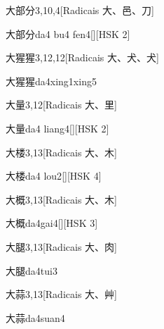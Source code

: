 \begin{entry}{大部分}{3,10,4}[Radicais ⼤、⾢、⼑]
  \begin{phonetics}{大部分}{da4 bu4 fen4}[][HSK 2]
  \end{phonetics}
\end{entry}

\begin{entry}{大猩猩}{3,12,12}[Radicais ⼤、⽝、⽝]
  \begin{phonetics}{大猩猩}{da4xing1xing5}
  \end{phonetics}
\end{entry}

\begin{entry}{大量}{3,12}[Radicais ⼤、⾥]
  \begin{phonetics}{大量}{da4 liang4}[][HSK 2]
  \end{phonetics}
\end{entry}

\begin{entry}{大楼}{3,13}[Radicais ⼤、⽊]
  \begin{phonetics}{大楼}{da4 lou2}[][HSK 4]
  \end{phonetics}
\end{entry}

\begin{entry}{大概}{3,13}[Radicais ⼤、⽊]
  \begin{phonetics}{大概}{da4gai4}[][HSK 3]
  \end{phonetics}
\end{entry}

\begin{entry}{大腿}{3,13}[Radicais ⼤、⾁]
  \begin{phonetics}{大腿}{da4tui3}
  \end{phonetics}
\end{entry}

\begin{entry}{大蒜}{3,13}[Radicais ⼤、⾋]
  \begin{phonetics}{大蒜}{da4suan4}
  \end{phonetics}
\end{entry}

